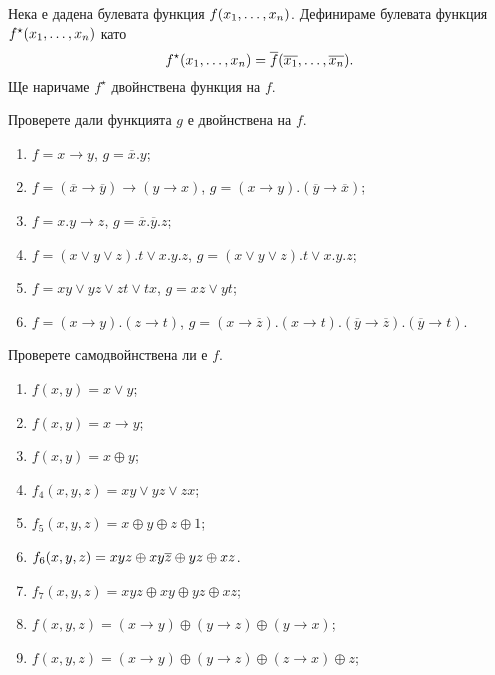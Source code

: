 Нека е дадена булевата функция $f(x_{1},\dots,x_{n})$. Дефинираме булевата функция $f^\star(x_{1},\dots,x_{n})$ като
\[f^\star(x_{1},\dots,x_{n}) = \overline{f}(\overline{x_1},\dots,\overline{x_n}).\]
Ще наричаме $f^\star$ двойнствена функция на $f$.

\begin{problem} %
  Проверете дали функцията $g$ е двойнствена на $f$.
  \begin{enumerate}[1)]
  \item
    $f = x\rightarrow y$, $g = \overline{x}.y$;
  \item
    $f = (\overline{x}\rightarrow\overline{y})\rightarrow(y\rightarrow x)$, $g = (x\rightarrow y).(\overline{y}\rightarrow\overline{x})$;
  \item
    $f = x.y \rightarrow z$, $g = \overline{x}.\overline{y}.z$;
  \item
    $f = (x\vee y\vee z).t\vee x.y.z$, $g = (x\vee y\vee z).t\vee x.y.z$;
  \item
    $f = xy\vee yz\vee zt\vee tx$, $g = xz\vee yt$;
  \item
    $f = (x\rightarrow y).(z\rightarrow t)$, $g = (x\rightarrow\overline{z}).(x\rightarrow t).(\overline{y}\rightarrow\overline{z}).(\overline{y}\rightarrow t)$.
  \end{enumerate}
\end{problem}

\begin{problem}
  Проверете самодвойнствена ли е $f$.
  \begin{enumerate}[1)]
  \item
    $f(x,y) = x\vee y$;
  \item
    $f(x,y) = x\rightarrow y$;
  \item
    $f(x,y) = x\oplus y$;
  \item
    $f_4(x,y,z) = xy\vee yz\vee zx$;
  \item
    $f_5(x,y,z) = x\oplus y\oplus z\oplus 1$;
  \item
    $f_6(x,y,z) = xyz\oplus xy\overline{z}\oplus yz\oplus xz$.
  \item
    $f_7(x,y,z) = xyz\oplus xy\oplus yz\oplus xz$;
  \item
    $f(x,y,z) = (x\rightarrow y)\oplus (y\rightarrow z)\oplus (y\rightarrow x)$;
  \item
    $f(x,y,z) = (x\rightarrow y)\oplus (y\rightarrow z)\oplus (z\rightarrow x)\oplus z$;
  \end{enumerate}
\end{problem}

